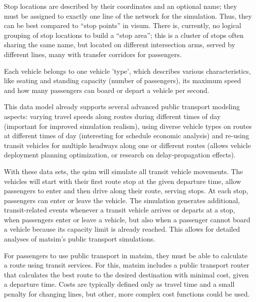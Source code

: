Stop locations are described by their coordinates and an optional name; they must
be assigned to exactly one line of the network for the simulation. Thus, they
can be best compared to ``stop points'' in \gls{visum}. There is, currently, no logical
grouping of stop locations to build a ``stop area''; this is a cluster of
stops often sharing the same name, but located on different intersection arms, 
served by different lines, many with transfer corridors for passengers.

Each vehicle belongs to one vehicle 'type', which describes various
characteristics, like seating and standing capacity (number of
passengers), its maximum speed and how many passengers can board or depart
a vehicle per second.

This data model already supports several advanced public transport modeling aspects: 
varying travel speeds along routes during different
times of day (important for improved simulation realism), using diverse vehicle types 
on routes at different times of day (interesting for schedule
economic analysis) and re-using transit vehicles for multiple
headways along one or different routes (allows vehicle deployment planning optimization, 
or research on delay-propagation effects).

With these data sets, the \gls{qsim} will simulate all transit vehicle movements.
The vehicles will start with their first route stop at the given
departure time, allow passengers to enter and then drive along their route,
serving stops. At each stop, passengers can enter or leave the vehicle.
The simulation generates additional, transit-related events whenever a transit
vehicle arrives or departs at a stop, when passengers enter or leave a vehicle,
but also when a passenger cannot board a vehicle because its capacity
limit is already reached. This allows for detailed analyses of \gls{matsim}'s public 
transport simulations.

For passengers to use public transport in \gls{matsim}, they must be able
to calculate a route using transit services. For this, \gls{matsim} includes a public
transport router that calculates the best route to the desired
destination with minimal cost, given a departure time. Costs are typically
defined only as travel time and a small penalty for changing lines, but other,
more complex cost functions could be used.

